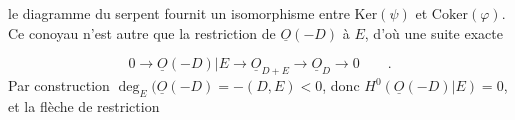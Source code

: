 \begin{center}
\end{center}
le diagramme du serpent fournit un isomorphisme entre $\mathrm{Ker}(\psi)$ et $\mathrm{Coker}(\varphi)$. Ce conoyau n'est autre que la restriction de $\underline{O}(-D)$ à $E$, d'où une suite exacte

\begin{equation*}
0 \longrightarrow \underline{O}(-D)|E \longrightarrow \underline{O}_{D+E} \longrightarrow \underline{O}_D \longrightarrow 0 \qquad .
\end{equation*}
Par construction $\deg_E(\underline{O}(-D) = - (D,E) < 0$, donc $H^0(\underline{O}(-D)|E) = 0$, et la flèche de restriction

